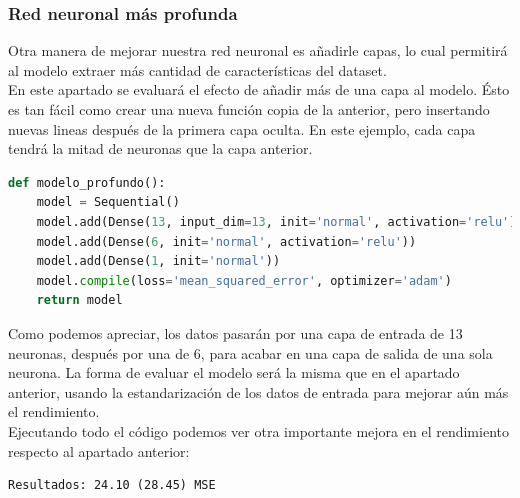 \subsubsection{Red neuronal más profunda}
Otra manera de mejorar nuestra red neuronal es añadirle capas, lo cual permitirá al modelo extraer más cantidad de características del dataset.\\
En este apartado se evaluará el efecto de añadir más de una capa al modelo. Ésto es tan fácil como crear una nueva función copia de la anterior, pero insertando nuevas lineas después de la primera capa oculta. En este ejemplo, cada capa tendrá la mitad de neuronas que la capa anterior.
\begin{lstlisting}[language=Python]
def modelo_profundo():
	model = Sequential()
	model.add(Dense(13, input_dim=13, init='normal', activation='relu'))
	model.add(Dense(6, init='normal', activation='relu'))
	model.add(Dense(1, init='normal'))
	model.compile(loss='mean_squared_error', optimizer='adam')
	return model
\end{lstlisting}
Como podemos apreciar, los datos pasarán por una capa de entrada de 13 neuronas, después por una de 6, para acabar en una capa de salida de una sola neurona. La forma de evaluar el modelo será la misma que en el apartado anterior, usando la estandarización de los datos de entrada para mejorar aún más el rendimiento.\\
Ejecutando todo el código podemos ver otra importante mejora en el rendimiento respecto al apartado anterior:
\begin{lstlisting}
Resultados: 24.10 (28.45) MSE
\end{lstlisting}
